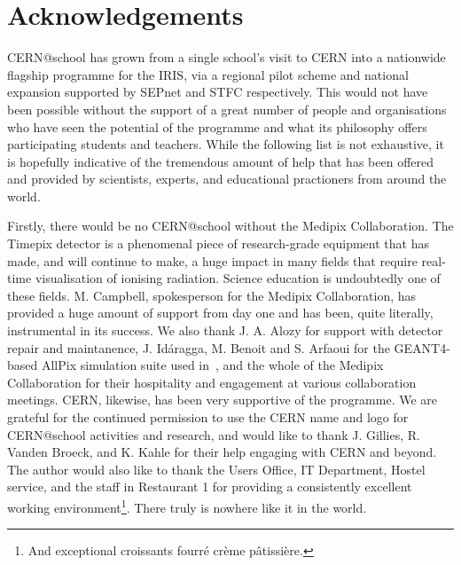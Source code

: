 \section{Acknowledgements}
\label{sec:ack}
CERN@school has grown from a single school's visit to \acs{CERN}
into a nationwide flagship programme for the \acf{IRIS},
via a regional pilot scheme and national expansion supported by
\ac{SEPnet} and \ac{STFC} respectively.
This would not have been possible without the support of a great number of
people and organisations who have seen the potential of the programme
and what its philosophy offers participating students and teachers.
While the following list is not exhaustive, it is hopefully indicative of
the tremendous amount of help that has been offered and provided
by scientists, experts, and educational practioners from around the world.

Firstly, there would be no CERN@school without the
Medipix Collaboration. The Timepix detector is a phenomenal piece of
research-grade equipment that has made, and will continue to make,
a huge impact in many fields
that require real-time visualisation of ionising radiation.
Science education is undoubtedly one of these fields.
M. Campbell, spokesperson for the Medipix Collaboration,
has provided a huge amount of support from day one
and has been, quite literally, instrumental in its success.
We also thank J. A. Alozy for support with detector repair
and maintanence, J. Id\'{a}ragga, M. Benoit and S. Arfaoui
for the GEANT4-based AllPix simulation suite used
in~\cite{Whyntie2014,Whyntie2015a,Whyntie2015b},
and the whole of the Medipix Collaboration for their
hospitality and engagement at various collaboration meetings.
%
CERN, likewise, has been very supportive of the programme.
We are grateful for the continued permission to use the
\acs{CERN} name and logo for CERN@school activities and research,
and would like to thank J. Gillies, R. Vanden Broeck, and K. Kahle
for their help engaging with CERN and beyond.
The author would also like to thank the Users Office,
IT Department, Hostel service, and the staff in Restaurant 1
for providing a consistently excellent working environment\footnote{%
And exceptional croissants fourr\'{e} cr\`{e}me p\^{a}tissi\`{e}re.}.
There truly is nowhere like it in the world.
%

